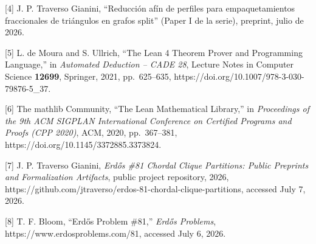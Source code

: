 \documentclass[
  spanish,
  11pt,
  a4paper,
]{article}
\begin{document}
{[}4{]} J. P. Traverso Gianini, ``Reducción afín de perfiles para empaquetamientos fraccionales de triángulos en grafos split'' (Paper I de la serie), preprint, julio de 2026.

{[}5{]} L. de Moura and S. Ullrich, ``The Lean 4 Theorem Prover and Programming Language,'' in \emph{Automated Deduction -- CADE 28}, Lecture Notes in Computer Science \textbf{12699}, Springer, 2021, pp.~625--635, https://doi.org/10.1007/978-3-030-79876-5\_37.

{[}6{]} The mathlib Community, ``The Lean Mathematical Library,'' in \emph{Proceedings of the 9th ACM SIGPLAN International Conference on Certified Programs and Proofs (CPP 2020)}, ACM, 2020, pp.~367--381, https://doi.org/10.1145/3372885.3373824.

{[}7{]} J. P. Traverso Gianini, \emph{Erdős \#81 Chordal Clique Partitions: Public Preprints and Formalization Artifacts}, public project repository, 2026, https://github.com/jtraverso/erdos-81-chordal-clique-partitions, accessed July 7, 2026.

{[}8{]} T. F. Bloom, ``Erdős Problem \#81,'' \emph{Erdős Problems}, https://www.erdosproblems.com/81, accessed July 6, 2026.
\end{document}
